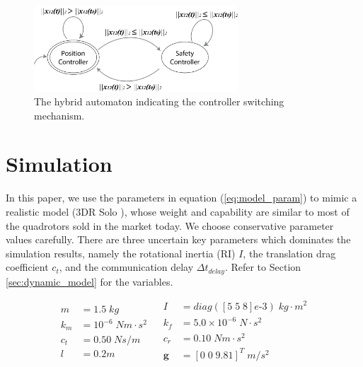 \documentclass[journal,11pt,onecolumn,draftclsnofoot,]{IEEEtran}
\begin{document}
\begin{figure}
\centering
\includegraphics[width=3in]{hybrid_automaton}
\caption{The hybrid automaton indicating the controller switching mechanism.}
\label{fig:hybrid_automaton}
\end{figure}

\section{\textbf{Simulation}} \label{sec:simulation}


In this paper, we use the parameters in equation (\ref{eq:model_param}) to mimic a realistic model (3DR Solo \cite{3dr_solo}), whose weight and capability are similar to most of the quadrotors sold in the market today. We choose conservative parameter values carefully. There are three uncertain key parameters which dominates the simulation results, namely the rotational inertia (RI) $I$, the translation drag coefficient $c_t$, and the communication delay $\Delta t_{delay}$. Refer to Section \ref{sec:dynamic_model} for the variables.

\begin{equation}
\label{eq:model_param}
\begin{aligned}
m &= 1.5 \; kg \\
k_m &= 10^{-6} \; Nm \cdot s^2 \;\;\; \\
c_t &=  0.50 \; Ns/m \;\;\;\\
l &= 0.2 m \\
\end{aligned}
\begin{aligned}
I &= diag([5 \; 5 \; 8]e\text{-}3) \; kg \cdot m^2 \\
k_f &= 5.0 \times 10^{-6} \; N \cdot s^2 \\
c_r &= 0.10 \; Nm \cdot s^2 \\
\boldsymbol{g} &= \left[0 \; 0\; 9.81 \right]^T \; m/s^2 \\
\end{aligned}
\end{equation}
\end{document}
